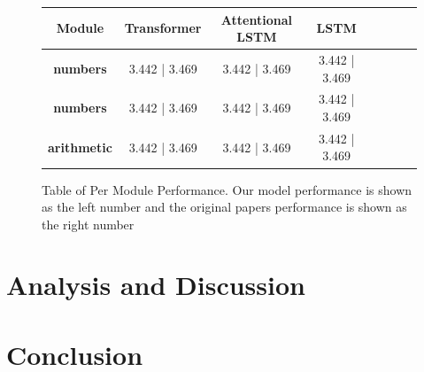 \begin{figure}[h]
\centering
\begin{tabular}{SSSSSSSS} 
    {\textbf{Module}} & {\textbf{Transformer}} & { \textbf{Attentional LSTM }} & {  \textbf{LSTM}} \\ \midrule
    \textbf{numbers}  &  3.442 | 3.469   & 3.442 | 3.469 & 3.442 | 3.469    \\ \midrule
    \textbf{numbers}  & 3.442 | 3.469   & 3.442 | 3.469 & 3.442 | 3.469   \\ \midrule
    \textbf{arithmetic}  & 3.442 | 3.469   & 3.442 | 3.469 & 3.442 | 3.469    \\ \bottomrule
\end{tabular}
\caption{Table of Per Module Performance. Our model performance is shown as the left number and the original papers performance is shown as the right number}
\end{figure}


\section{Analysis and Discussion}


\section{Conclusion}



